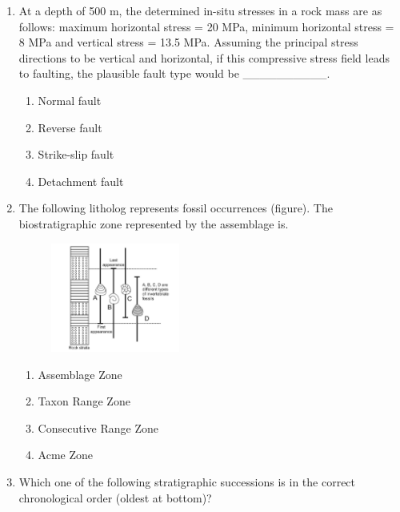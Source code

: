 \documentclass[journal,12pt,onecolumn]{IEEEtran}
\begin{document}
\begin{enumerate}
\begin{enumerate}
\item At a depth of 500 m, the determined in-situ stresses in a rock mass are as follows: maximum horizontal stress = 20 MPa, minimum horizontal stress = 8 MPa and vertical stress = 13.5 MPa. Assuming the principal stress directions to be vertical and horizontal, if this compressive stress field leads to faulting, the plausible fault type would be __________.

\hfill{}

\begin{multicols}{2}
\begin{enumerate}
\item Normal fault
\item Reverse fault
\item Strike-slip fault
\item Detachment fault
\end{enumerate}
\end{multicols}

\item The following litholog represents fossil occurrences (figure). The biostratigraphic zone represented by the assemblage is.

\hfill{}

\begin{figure}[h!]
    \centering
    \includegraphics[width=0.4\textwidth]{figs/fig10.png}
    \caption{}
    \label{fig:q18}
\end{figure}


\begin{multicols}{2}
\begin{enumerate}
\item Assemblage Zone
\item Taxon Range Zone
\item Consecutive Range Zone
\item Acme Zone
\end{enumerate}
\end{multicols}

\item Which one of the following stratigraphic successions is in the correct chronological order (oldest at bottom)?


\end{enumerate}
\end{enumerate}
\end{document}
